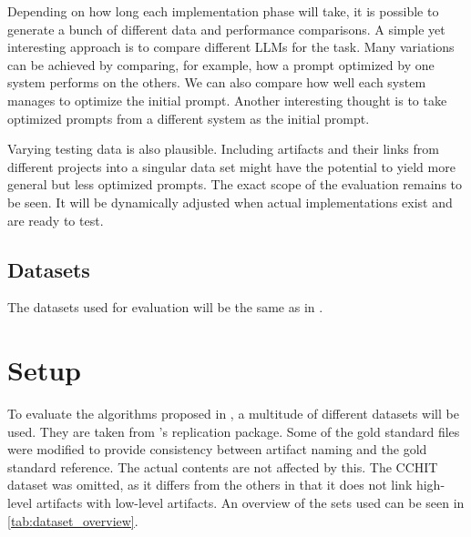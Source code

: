 Depending on how long each implementation phase will take, it is possible to generate a bunch of different data and performance comparisons.
A simple yet interesting approach is to compare different LLMs for the task.
Many variations can be achieved by comparing, for example, how a prompt optimized by one system performs on the others.
We can also compare how well each system manages to optimize the initial prompt.
Another interesting thought is to take optimized prompts from a different system as the initial prompt.

Varying testing data is also plausible.
Including artifacts and their links from different projects into a singular data set might have the potential to yield more general but less optimized prompts.
The exact scope of the evaluation remains to be seen.
It will be dynamically adjusted when actual implementations exist and are ready to test.


\subsection{Datasets}
\label{approach:sec:datasets}
The datasets used for evaluation will be the same as in .


\section{Setup}
\label{sec:Evaluation:setup}
To evaluate the \APE algorithms proposed in , a multitude of different datasets will be used.
They are taken from 's replication package.
Some of the gold standard files were modified to provide consistency between artifact naming and the gold standard reference.
The actual contents are not affected by this.
The CCHIT dataset was omitted, as it differs from the others in that it does not link high-level artifacts with low-level artifacts.
An overview of the sets used can be seen in \autoref{tab:dataset_overview}.

